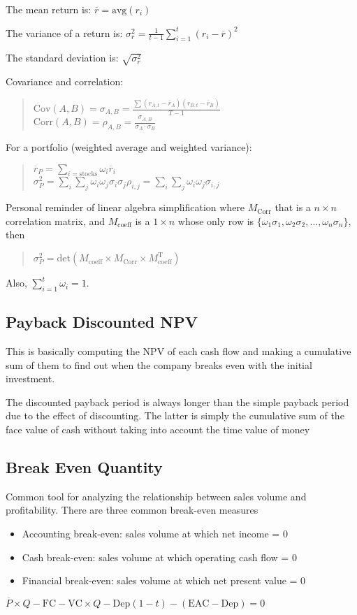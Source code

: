The mean return is: $\overline{r}=\text{avg}(r_i)$

The variance of a return is: $\sigma_r^2 = \frac{1}{t-1}\sum_{i=1}^{t}(r_i-\overline{r})^2$

The standard deviation is: $\sqrt{\sigma_r^2}$

Covariance and correlation:

\blockquote{
  $\mathrm{Cov}(A,B) = \sigma_{A,B} = \frac{\sum(r_{A,t}-\overline{r}_A)(r_{B,t}-\overline{r}_B)}{T-1}$ \\
  $\mathrm{Corr}(A,B) = \rho_{A,B} = \frac{\sigma_{A,B}}{\sigma_A\cdot\sigma_B}$
}

For a portfolio (weighted average and weighted variance):
\blockquote{
  $\overline{r}_P=\sum_{i=\text{stocks}}\omega_i\overline{r}_i$ \\
  $\sigma_P^2=\sum_{i}\sum_{j}\omega_i\omega_j\sigma_i\sigma_j\rho_{i,j}=\sum_{i}\sum_{j}\omega_i\omega_j\sigma_{i,j}$
}

Personal reminder of linear algebra simplification where
$M_{\mathrm{Corr}}$ that is a $n\times n$ correlation matrix, and
$M_{\mathrm{coeff}}$ is a $1\times n$ whose only row is $
\{\omega_1\sigma_1, \omega_2\sigma_2, \dots, \omega_n\sigma_n\}$, then

\blockquote{
  $\sigma_P^2 = \mathrm{det}\left(M_{\mathrm{coeff}}\times M_{\mathrm{Corr}}\times M_{\mathrm{coeff}}^{\mathrm{T}}\right)$
}

Also, $\sum_{i=1}^{t}\omega_i = 1$.

\subsection{Payback Discounted NPV}
This is basically computing the NPV of each cash flow and making a
cumulative sum of them to find out when the company breaks even with the
initial investment.

The discounted payback period is always longer than the simple payback
period due to the effect of discounting. The latter is simply the
cumulative sum of the face value of cash without taking into account the
time value of money

\subsection{Break Even Quantity}
Common tool for analyzing the relationship between sales volume and
profitability. There are three common break-even measures
\begin{itemize}
  \item Accounting break-even: sales volume at which net income = 0
  \item Cash break-even: sales volume at which operating cash flow = 0
  \item Financial break-even: sales volume at which net present value = 0
\end{itemize}
$\overline{P}\times Q-\mathrm{FC}-\mathrm{VC}\times Q-\text{Dep}(1-t)-(\mathrm{EAC}-\text{Dep}) = 0$

